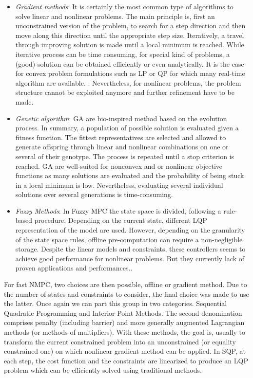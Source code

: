 \documentclass[a4paper, 12pt]{report}
\begin{document}
\begin{itemize}
\item \emph{Gradient methods}: It is certainly the most common type of algorithms to solve linear and nonlinear problems. The main principle is, first an unconstrained version of the problem, to search for a step direction and then move along this direction until the appropriate step size. Iteratively, a travel through improving solution is made until a local minimum is reached. While iterative process can be time consuming, for special kind of problems, a (good) solution can be obtained efficiently or even analytically. It is the case for convex problem formulations such as LP or QP for which many real-time algorithm are available. \cite{Nocedal1999, Wang2008}. Nevertheless, for nonlinear problems, the problem structure cannot be exploited anymore and further refinement have to be made.
\item \emph{Genetic algorithm}: GA are bio-inspired method based on the evolution process. In summary, a population of possible solution is evaluated given a fitness function. The fittest representatives are selected and allowed to generate offspring through linear and nonlinear combinations on one or several of their genotype. The process is repeated until a stop criterion is reached. GA are well-suited for nonconvex and or nonlinear objective functions as many solutions are evaluated and the probability of being stuck in a local minimum is low. Nevertheless, evaluating several individual solutions over several generations is time-consuming. \cite{Zheng2015}
\item \emph{Fuzzy Methods}: In Fuzzy MPC the state space is divided, following a rule-based procedure. Depending on the current state, different LQP representation of the model are used. However, depending on the granularity of the state space rules, offline pre-computation can require a non-negligible storage. Despite the linear models and constraints, these controllers seems to achieve good performance for nonlinear problems. But they currently lack of proven applications and performances.\cite{Zheng2015}.
\end{itemize}


For fast NMPC, two choices are then possible, offline or gradient method. Due to the number of states and constraints to consider, the final choice was made to use the latter. Once again we can part this group in two categories. Sequential Quadratic Programming and Interior Point Methods. The second denomination comprises penalty (including barrier) and more generally augmented Lagrangian methods (or methods of multipliers). With these methods, the goal is, usually to transform the current constrained problem into an unconstrained (or equality constrained one) on which nonlinear gradient method can be applied. In SQP, at each step, the cost function and the constraints are linearized to produce an LQP problem which can be efficiently solved using traditional methods.
\end{document}
